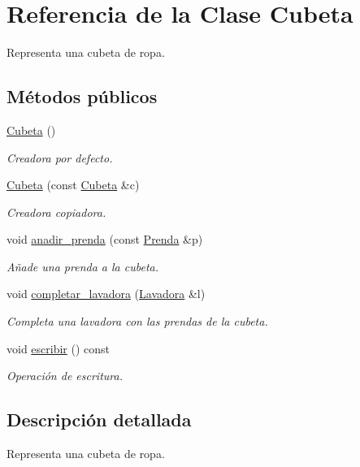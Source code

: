 \hypertarget{class_cubeta}{\section{Referencia de la Clase Cubeta}
\label{class_cubeta}
}


Representa una cubeta de ropa.  


\subsection*{Métodos públicos}
\begin{DoxyCompactItemize}
\item 
\hyperlink{class_cubeta_ae85e70c9cd67454446439891e3f435e1}{Cubeta} ()
\begin{DoxyCompactList}\small\item\em Creadora por defecto. \end{DoxyCompactList}\item 
\hyperlink{class_cubeta_a9615e48038899c5732f61661585f12c7}{Cubeta} (const \hyperlink{class_cubeta}{Cubeta} \&c)
\begin{DoxyCompactList}\small\item\em Creadora copiadora. \end{DoxyCompactList}\item 
void \hyperlink{class_cubeta_a431873df8f99cebe56b4787a5271e395}{anadir\-\_\-prenda} (const \hyperlink{class_prenda}{Prenda} \&p)
\begin{DoxyCompactList}\small\item\em Añade una prenda a la cubeta. \end{DoxyCompactList}\item 
void \hyperlink{class_cubeta_a3586257f2f2eacefc47714c6a3a01875}{completar\-\_\-lavadora} (\hyperlink{class_lavadora}{Lavadora} \&l)
\begin{DoxyCompactList}\small\item\em Completa una lavadora con las prendas de la cubeta. \end{DoxyCompactList}\item 
void \hyperlink{class_cubeta_a878904c34f1b3361c3913bbaf735ed12}{escribir} () const 
\begin{DoxyCompactList}\small\item\em Operación de escritura. \end{DoxyCompactList}\end{DoxyCompactItemize}


\subsection{Descripción detallada}
Representa una cubeta de ropa. 

